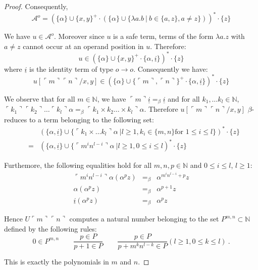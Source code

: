 \documentclass{article}
\newcommand{\encode}[1]{\ulcorner #1 \urcorner}
\newcommand{\nat}{\mathbb{N}}
\newcommand{\union}{\cup}
\begin{document}
\begin{proof}
Consequently, $$\mathcal{A}^o = \left( \{\alpha \} \union \{x,y\}^+ \cdot \left( \{\alpha \} \union \{\lambda a.b \ | \ b \in \{a,z\}, a \neq z \} \right) \right)^* \cdot \{ z \}$$

We have $u \in \mathcal{A}^o$. Moreover since $u$ is a safe term,
terms of the form $\lambda a . z$ with $a \neq z$ cannot occur at an
operand position in $u$. Therefore:
$$u \in \left( \{\alpha\} \union \{x,y\}^+ \cdot \{\alpha,
\underline{i} \} \right)^* \cdot \{ z \}$$
where $\underline{i}$ is the identity term of type $o\rightarrow o$.
Consequently we have:
$$u[\encode{m} \encode{n}/x,y] \in \left( \{ \alpha \} \union \{\encode{m},\encode{n}\}^+ \cdot \{\alpha, \underline{i} \} \right)^* \cdot \{ z \}$$

We observe that for all $m \in \nat$, we have $\encode{m} \underline{i} =_\beta \underline{i}$ and for all $k_1, \ldots k_l \in \nat$, 
$\encode{k_1} \encode{k_2} \ldots \encode{k_l} \alpha =_\beta
\encode{k_1\times k_2 \ldots \times k_l} \alpha$. Therefore
$u[\encode{m} \encode{n}/x,y]$ $\beta$-reduces to a term belonging
to the following set:
\begin{eqnarray*}
&& \left( \{\alpha, \underline{i} \} \union \{ \encode{k_1 \times
\ldots k_l} \alpha \ | l\geq 1,  k_i \in \{m,n\} \mbox{for } 1\leq i \leq l \} \right)^* \cdot \{ z \} \\
&=& \left( \{\alpha, \underline{i} \} \union \{ \encode{m^i n^{l-i}}
\alpha \ | l\geq 1,  0 \leq i \leq l \right)^* \cdot \{ z \}
\end{eqnarray*} 

Furthemore, the following equalities hold for all $m,n,p\in \nat$ and
$0 \leq i \leq l$, $l\geq 1$:
\begin{eqnarray*}
\encode{m^i n^{l-i}} \alpha (\alpha^p z) &=_\beta&
\alpha^{m^i n^{l-i} + p} z \\
\alpha ( \alpha^p z ) &=_\beta& \alpha^{p+1} z \\
\underline{i} ( \alpha^p z ) &=_\beta& \alpha^p z
\end{eqnarray*}

Hence $U \encode{m} \encode{n}$ computes a natural number
belonging to the
set $P^{m,n} \subset \nat$ defined by the following rules:
$$ 0 \in P^{m,n}   \qquad \frac{p \in P}{p+1 \in P} 
\qquad \frac{p \in P}{p+m^k n^{l-k} \in P}(l\geq 1,0\leq k \leq l)
\ .$$

This is exactly the polynomials in $m$ and $n$.


\end{proof}
\end{document}
